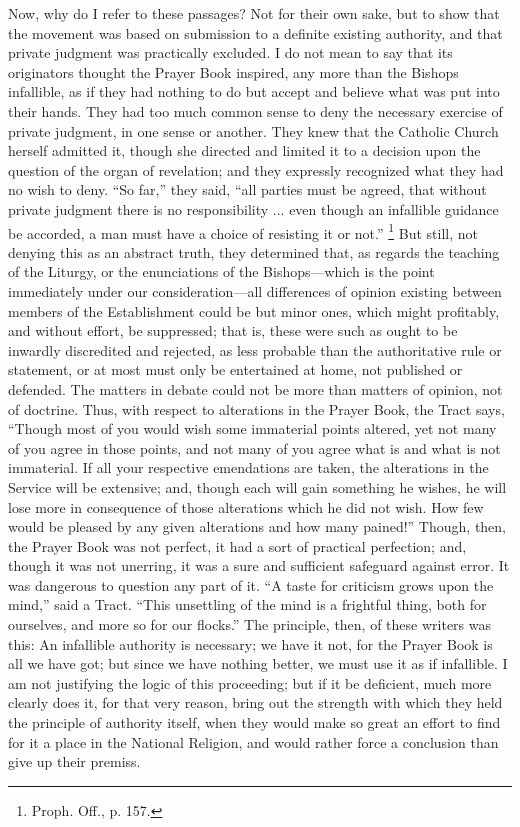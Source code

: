 Now, why do I refer to these passages? Not for their own sake, but
to show that the movement was based on submission to a definite
existing authority, and that private judgment was practically
excluded. I do not mean to say that its originators thought the
Prayer Book inspired, any more than the Bishops infallible, as if they
had nothing to do but accept and believe what was put into their
hands. They had too much common sense to deny the necessary exercise
of private judgment, in one sense or another. They knew that the
Catholic Church herself admitted it, though she directed and limited
it to a decision upon the question of the organ of revelation; and
they expressly recognized what they had no wish to deny. ``So
far,'' they said, ``all parties must be agreed, that without
private judgment there is no responsibility ... even though an
infallible guidance be accorded, a man must have a choice of resisting
it or not.'' \footnote{Proph. Off., p. 157.} But
still, not denying this as an abstract truth, they determined that, as
regards the teaching of the Liturgy, or the enunciations of the
Bishops—which is the point immediately under our consideration—all
differences of opinion existing between members of the Establishment
could be but minor ones, which might profitably, and without effort,
be suppressed; that is, these were such as ought to be inwardly
discredited and rejected, as less probable than the authoritative rule
or statement, or at most must only be entertained at home, not
published or defended. The matters in debate could not be more than
matters of opinion, not of doctrine. Thus, with respect to alterations
in the Prayer Book, the Tract says, ``Though most of you would
wish some immaterial points altered, yet not many of you agree in
those points, and not many of you agree what is and what is not
immaterial. If all your respective emendations are taken, the
alterations in the Service will be extensive; and, though each will
gain something he wishes, he will lose more in consequence of those
alterations which he did not wish. How few would be pleased by any
given alterations and how many pained!'' Though, then, the Prayer
Book was not perfect, it had a sort of practical perfection; and,
though it was not unerring, it was a sure and sufficient safeguard
against error. It was dangerous to question any part of it. ``A
taste for criticism grows upon the mind,'' said a Tract.
``This unsettling of the mind is a frightful thing, both for
ourselves, and more so for our flocks.'' The principle, then, of
these writers was this: An infallible authority is necessary; we have
it not, for the Prayer Book is all we have got; but since we have
nothing better, we must use it as if infallible. I am not justifying
the logic of this proceeding; but if it be deficient, much more
clearly does it, for that very reason, bring out the strength with
which they held the principle of authority itself, when they would
make so great an effort to find for it a place in the National
Religion, and would rather force a conclusion than give up their
premiss.

